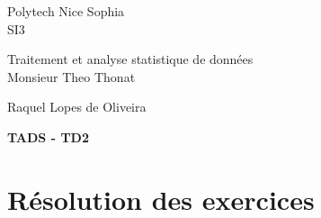\documentclass[12pt,a4paper]{article}
\theoremstyle{plain}
\begin{document}
\begin{center}
{\large\sc Polytech Nice Sophia} \\
{\large\sc SI3} \\

\vspace*{0.2cm}

{\sc Traitement et analyse statistique de données} \\
{Monsieur Theo Thonat }

\vspace*{0.2cm}
 Raquel Lopes de Oliveira

\vspace*{0.4cm}

{\large\bf  TADS - TD2 }

\end{center}

%


\section{Résolution des exercices}



\end{document}
